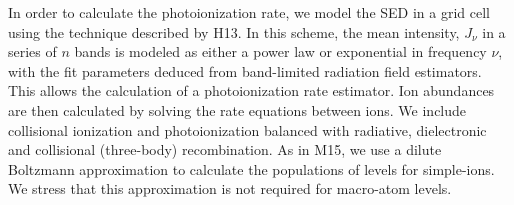 \documentclass[useAMS,usenatbib]{mn2e_x}
\begin{document}
In order to calculate the photoionization rate, 
we model the SED in a grid cell using the technique described by H13. In this scheme,
the mean intensity, $J_{\nu}$ in a series of $n$ bands is modeled as either a power law or exponential
in frequency $\nu$, with the fit parameters deduced from band-limited radiation field estimators.
This allows the calculation of a photoionization rate estimator. Ion abundances are
then calculated by solving the rate equations between ions. We include collisional ionization and photoionization balanced with radiative, 
dielectronic and collisional (three-body) recombination.
As in M15, we use a dilute Boltzmann approximation to calculate 
the populations of levels for simple-ions. We stress that this approximation 
is not required for macro-atom levels. 
\end{document}
